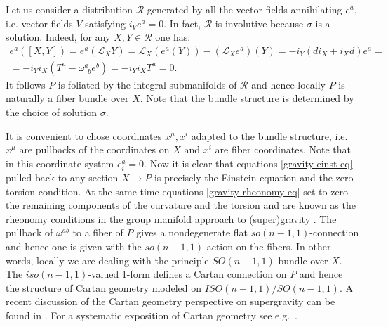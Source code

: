 \documentclass[a4paper,12pt]{article}
\numberwithin{equation}{section} %
\renewcommand{\tilde}{\widetilde}
\numberwithin{equation}{section}
\begin{document}
Let us consider a distribution $\mathcal{R}$ generated by all the vector fields annihilating $e^a$, i.e. vector fields $V$ satisfying $i_Ve^a=0$. In fact, $\mathcal{R}$ is involutive because $\sigma$ is a solution. Indeed, for any $X, Y \in \mathcal{R}$ one has:
\begin{equation}
\begin{gathered}
       e^a([X,Y]) = e^a(\mathcal{L}_XY) = \mathcal{L}_X\left(e^a(Y)\right) - (\mathcal{L}_Xe^a)(Y) = -i_Y(di_X + i_Xd)e^a =\\
       = -i_Yi_X (T^a-\omega^a_{\enspace b}e^b) = -i_Yi_X T^a = 0. 
\end{gathered}
\end{equation}
It follows $P$ is foliated by the integral submanifolds of $\mathcal{R}$ and hence locally $P$ is naturally a fiber bundle over $X$. Note that the bundle structure is determined by the choice of solution $\sigma$.

It is convenient to chose coordinates $x^\mu,x^i$ adapted to the bundle structure, i.e. $x^\mu$ are pullbacks of the coordinates on $X$ and $x^i$ are fiber coordinates. Note that in this coordinate system $e^a_i = 0$.
Now it is clear that equations  \eqref{gravity-einst-eq} pulled back to any section $X\to P$ is precisely the Einstein equation and the zero torsion condition. At the same time equations \eqref{gravity-rheonomy-eq} set to zero the remaining components of the curvature and the torsion and are known as the rheonomy conditions in the group manifold approach to (super)gravity \cite{DAuria:1982mkx,Castellani:1991et}. The pullback of $\omega^{ab}$ to a fiber of $P$ gives a nondegenerate  flat $so(n-1,1)$-connection and hence one is given with the $so(n-1,1)$ action on the fibers. In other words, locally we are dealing with the principle $SO(n-1,1)$-bundle over $X$. The $iso(n-1,1)$-valued 1-form defines a Cartan connection on $P$ and hence the structure of Cartan geometry modeled on $ISO(n-1,1)/SO(n-1,1)$. A recent discussion of the Cartan geometry perspective on supergravity can be found in \cite{Francois:2024rfh}. For a systematic exposition of Cartan geometry see e.g.~\cite{sharpe2000differential,Wise2009,cap2009parabolic}.


\end{document}
